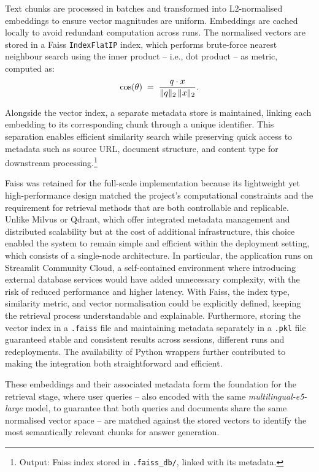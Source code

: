 \begin{spacing}{1.5}
Text chunks are processed in batches and transformed into L2-normalised embeddings to ensure vector magnitudes are uniform. Embeddings are cached locally to avoid redundant computation across runs. The normalised vectors are stored in a Faiss \texttt{IndexFlatIP} index, which performs brute-force nearest neighbour search using the inner product -- i.e., dot product -- as metric, computed as:
\[
\cos(\theta) \;=\; \frac{q \cdot x}{\|q\|_2 \, \|x\|_2}.\\
\]

Alongside the vector index, a separate metadata store is maintained, linking each embedding to its corresponding chunk through a unique identifier. This separation enables efficient similarity search while preserving quick access to metadata such as source URL, document structure, and content type for downstream processing.\footnote{Output: Faiss index stored in \texttt{.faiss\_db/}, linked with its metadata.}

Faiss was retained for the full-scale implementation because its lightweight yet high-performance design matched the project’s computational constraints and the requirement for retrieval methods that are both controllable and replicable. Unlike Milvus or Qdrant, which offer integrated metadata management and distributed scalability but at the cost of additional infrastructure, this choice enabled the system to remain simple and efficient within the deployment setting, which consists of a single-node architecture. In particular, the application runs on Streamlit Community Cloud, a self-contained environment where introducing external database services would have added unnecessary complexity, with the risk of reduced performance and higher latency. With Faiss, the index type, similarity metric, and vector normalisation could be explicitly defined, keeping the retrieval process understandable and explainable. Furthermore, storing the vector index in a \texttt{.faiss} file and maintaining metadata separately in a \texttt{.pkl} file guaranteed stable and consistent results across sessions, different runs and redeployments. The availability of Python wrappers further contributed to making the integration both straightforward and efficient.

These embeddings and their associated metadata form the foundation for the retrieval stage, where user queries -- also encoded with the same \textit{multilingual-e5-large} model, to guarantee that both queries and documents share the same normalised vector space -- are matched against the stored vectors to identify the most semantically relevant chunks for answer generation.


\end{spacing}
